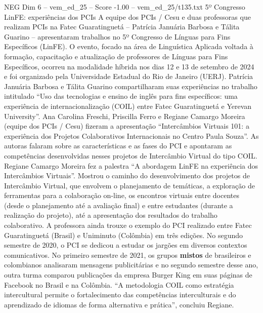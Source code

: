 \begin{textsample}{NEG Dim 6 – vem\_ed\_25 – Score -1.00 – vem\_ed\_25/t135.txt}  \label{ex:f6_neg_062}
5º Congresso LinFE: experiências dos PCIs A equipe dos PCIs / Cesu e duas professoras que realizam PCIs na Fatec Guaratinguetá – Patrícia Januária Barbosa e Tálita Guarino – apresentaram trabalhos no 5º Congresso de Línguas para Fins Específicos (LinFE).
O evento, focado na área de Linguística Aplicada voltada à formação, capacitação e atualização de professores de Línguas para Fins Específicos, ocorreu na modalidade híbrida nos dias 12 e 13 de setembro de 2024 e foi organizado pela Universidade Estadual do Rio de Janeiro (UERJ).
Patrícia Januária Barbosa e Tálita Guarino compartilharam suas experiências no trabalho intitulado “Uso das tecnologias e ensino de inglês para fins específicos: uma experiência de internacionalização (COIL) entre Fatec Guaratinguetá e Yerevan University”.
Ana Carolina Freschi, Priscilla Ferro e Regiane Camargo Moreira (equipe dos PCIs / Cesu) fizeram a apresentação “Intercâmbios Virtuais 101: a experiência dos Projetos Colaborativos Internacionais no Centro Paula Souza”.
As autoras falaram sobre as características e as fases do PCI e apontaram as competências desenvolvidas nesses projetos de Intercâmbio Virtual do tipo COIL.
Regiane Camargo Moreira fez a palestra “A abordagem LinFE na experiência dos Intercâmbios Virtuais”.
Mostrou o caminho do desenvolvimento dos projetos de Intercâmbio Virtual, que envolvem o planejamento de temáticas, a exploração de ferramentas para a colaboração on-line, os encontros virtuais entre docentes (desde o planejamento até a avaliação final) e entre estudantes (durante a realização do projeto), até a apresentação dos resultados do trabalho colaborativo.
A professora ainda trouxe o exemplo do PCI realizado entre Fatec Guaratinguetá (Brasil) e Uniminuto (Colômbia) em três edições.
No segundo semestre de 2020, o PCI se dedicou a estudar os jargões em diversos contextos comunicativos.
No primeiro semestre de 2021, os grupos \textbf{mistos} de brasileiros e colombianos analisaram mensagens publicitárias e no segundo semestre desse ano, outra turma comparou publicações da empresa Burger King em suas páginas de Facebook no Brasil e na Colômbia. “A metodologia COIL como estratégia intercultural permite o fortalecimento das competências interculturais e do aprendizado de idiomas de forma alternativa e prática”, concluiu Regiane.

\end{textsample}
